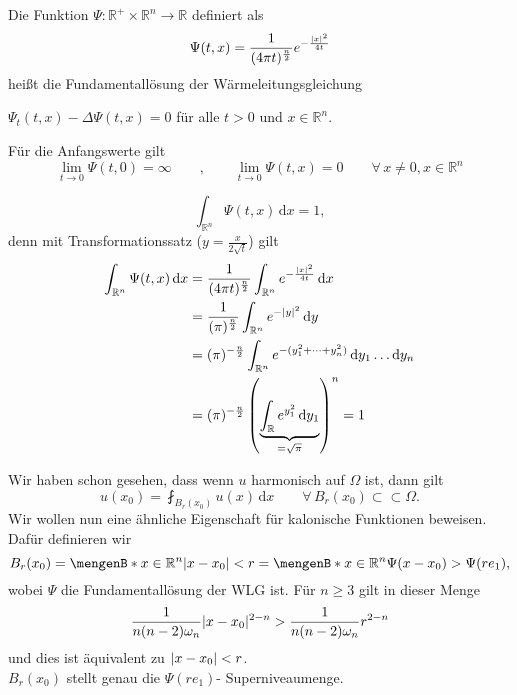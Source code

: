 \begin{definition}
	Die Funktion $\Psi : \mathbb{R}^+ \times \mathbb{R}^n \to \mathbb{R}$ definiert als 
	\[
		\Psi(t,x) = \frac{1}{(4 \pi t)^{\frac{n}{2}}} e^{-\frac{\lvert x\rvert^2}{4t}}
	\]
	heißt die Fundamentallösung der Wärmeleitungsgleichung
\end{definition}
\begin{bemerkung}
	\item $ \Psi_t(t,x) - \Delta \Psi(t,x) = 0$ für alle $t>0$ und $x \in \mathbb{R}^n$.
	\item Für die Anfangswerte gilt
	\[
		\lim_{t \to 0} \Psi(t,0) = \infty \qquad , \qquad \lim_{t \to 0} \Psi(t,x) = 0 \qquad \forall\, x \neq 0, x \in \mathbb{R}^n
	\]
	\item \[
		\int_{\mathbb{R}^n}^{} \Psi(t,x) \,\mathrm{d}x = 1,
	\]
	denn mit Transformationssatz ($ y = \frac{x}{2 \sqrt{t}}$) gilt
	\begin{align*}
		\int_{\mathbb{R}^n}^{}\Psi(t,x) \,\mathrm{d}x &= \frac{1}{(4 \pi t)^{\frac{n}{2}}} \int_{\mathbb{R}^n}^{}e^{-\frac{\lvert x\rvert^2}{4t}} \,\mathrm{d}x \\
		&= \frac{1}{(\pi)^{\frac{n}{2}}} \int_{\mathbb{R}^n}^{} e^{- \lvert y\rvert^2} \,\mathrm{d}y \\
		&= (\pi)^{- \frac{n}{2}} \int_{\mathbb{R}^n}^{} e^{-(y_1^2 + \dots + y_n^2)} \,\mathrm{d}y_1 \dots \mathrm{d}y_n \\
		&= (\pi)^{- \frac{n}{2}} \left( \underset{= \sqrt{\pi}}{\underbrace{\int_{\mathbb{R}}^{} e^{y_1^2} \,\mathrm{d}y_1}} \right)^n = 1
	\end{align*}
\end{bemerkung}
Wir haben schon gesehen, dass wenn $u$ harmonisch auf $\Omega$ ist, dann gilt
\[
	u(x_0) = \fint_{B_r(x_0)}^{} u(x) \,\mathrm{d}x \qquad \forall\, B_r(x_0) \subset \subset \Omega.
\]
Wir wollen nun eine ähnliche Eigenschaft für kalonische Funktionen beweisen. Dafür definieren wir
\[
	B_r(x_0) = \set[x \in \mathbb{R}^n]{\abs{x-x_0}< r} = \set[x \in \mathbb{R}^n]{\Psi(x-x_0) > \Psi(re_1)},
\]
wobei $\Psi$ die Fundamentallösung der WLG ist. Für $n \geq 3$ gilt in dieser Menge
\[
	\frac{1}{n(n-2)\omega_n} \lvert x- x_0\rvert^{2-n} > \frac{1}{n(n-2)\omega_n} r ^{2-n}
\]
und dies ist äquivalent zu $\lvert x-x_0\rvert<r$.\\
$B_r(x_0)$ stellt genau die $\Psi(re_1)$- Superniveaumenge.

